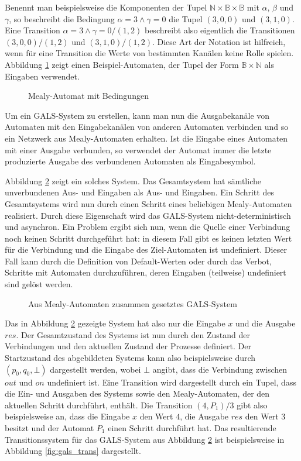 Benennt man beispielsweise die Komponenten der Tupel $\mathbb{N}\times\mathbb{B}\times\mathbb{B}$ mit $\alpha$, $\beta$ und $\gamma$, so beschreibt die Bedingung $\alpha=3\land\gamma=0$ die Tupel $(3,0,0)$ und $(3,1,0)$.
Eine Transition $\alpha=3\land\gamma=0/(1,2)$ beschreibt also eigentlich die Transitionen $(3,0,0)/(1,2)$ und $(3,1,0)/(1,2)$.
Diese Art der Notation ist hilfreich, wenn für eine Transition die Werte von bestimmten Kanälen keine Rolle spielen.
Abbildung \ref{fig:mealy2} zeigt einen Beispiel-Automaten, der Tupel der Form $\mathbb{B}\times\mathbb{N}$ als Eingaben verwendet.

\begin{figure}[h]
  \centering
  
  \caption{Mealy-Automat mit Bedingungen}
  \label{fig:mealy2}
\end{figure}

Um ein GALS-System zu erstellen, kann man nun die Ausgabekanäle von Automaten mit den Eingabekanälen von anderen Automaten verbinden und so ein Netzwerk aus Mealy-Automaten erhalten.
Ist die Eingabe eines Automaten mit einer Ausgabe verbunden, so verwendet der Automat immer die letzte produzierte Ausgabe des verbundenen Automaten als Eingabesymbol.

Abbildung \ref{fig:mealy3} zeigt ein solches System.
Das Gesamtsystem hat sämtliche unverbundenen Aus- und Eingaben als Aus- und Eingaben.
Ein Schritt des Gesamtsystems wird nun durch einen Schritt eines beliebigen Mealy-Automaten realisiert.
Durch diese Eigenschaft wird das GALS-System nicht-deterministisch und asynchron.
Ein Problem ergibt sich nun, wenn die Quelle einer Verbindung noch keinen Schritt durchgeführt hat: in diesem Fall gibt es keinen letzten Wert für die Verbindung und die Eingabe des Ziel-Automaten ist undefiniert.
Dieser Fall kann durch die Definition von Default-Werten oder durch das Verbot, Schritte mit Automaten durchzuführen, deren Eingaben (teilweise) undefiniert sind gelöst werden.
\begin{figure}[h]
  \centering
  
  \caption{Aus Mealy-Automaten zusammen gesetztes GALS-System}
  \label{fig:mealy3}
\end{figure}

Das in Abbildung \ref{fig:mealy3} gezeigte System hat also nur die Eingabe $x$ und die Ausgabe $\mathit{res}$.
Der Gesamtzustand des Systems ist nun durch den Zustand der Verbindungen und den aktuellen Zustand der Prozesse definiert.
Der Startzustand des abgebildeten Systems kann also beispielsweise durch $(p_0,q_0,\bot)$ dargestellt werden, wobei $\bot$ angibt, dass die Verbindung zwischen $\mathit{out}$ und $\mathit{on}$ undefiniert ist.
Eine Transition wird dargestellt durch ein Tupel, dass die Ein- und Ausgaben des Systems sowie den Mealy-Automaten, der den aktuellen Schritt durchführt, enthält.
Die Transition $(4,P_1)/3$ gibt also beispielsweise an, dass die Eingabe $x$ den Wert $4$, die Ausgabe $\mathit{res}$ den Wert $3$ besitzt und der Automat $P_1$ einen Schritt durchführt hat.
Das resultierende Transitionssystem für das GALS-System aus Abbildung \ref{fig:mealy3} ist beispielsweise in Abbildung \ref{fig:gals_trans} dargestellt.

